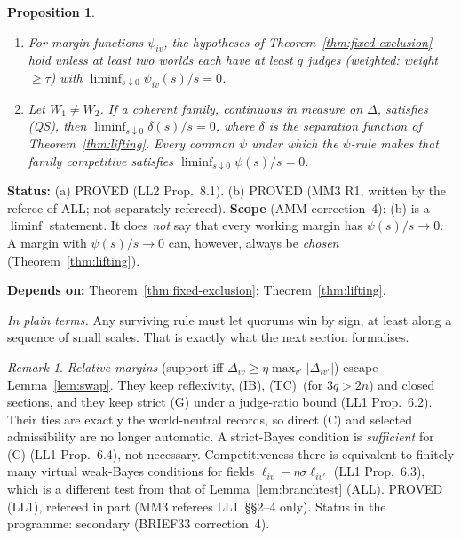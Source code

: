 \documentclass[11pt]{article}
\newtheorem{proposition}[theorem]{Proposition}
\theoremstyle{definition}
\theoremstyle{remark}
\newtheorem{remark}[theorem]{Remark}
\newcommand{\src}[1]{\textsf{#1}}
\newcommand{\status}[1]{\par\smallskip\noindent\textbf{Status:} #1\par}
\newcommand{\deps}[1]{\noindent\textbf{Depends on:} #1\par}
\newcommand{\inwords}[1]{\noindent\textit{In plain terms.} #1\par\smallskip}
\newcommand{\QS}{\textup{(QS)}}
\newcommand{\TC}{\textup{(TC)}}
\begin{document}
\begin{proposition}\label{prop:survivors}
\begin{enumerate}[label=(\alph*)]
\item For margin functions $\psi_{iv}$, the hypotheses of Theorem~\ref{thm:fixed-exclusion} hold unless at least two worlds each have at least $q$ judges (weighted: weight $\ge\tau$) with $\liminf_{s\downarrow0}\psi_{iv}(s)/s=0$.
\item Let $W_1\ne W_2$. If a coherent family, continuous in measure on $\Delta$, satisfies \QS, then $\liminf_{s\downarrow0}\delta(s)/s=0$, where $\delta$ is the separation function of Theorem~\ref{thm:lifting}. Every common $\psi$ under which the $\psi$-rule makes that family competitive satisfies $\liminf_{s\downarrow0}\psi(s)/s=0$.
\end{enumerate}
\end{proposition}
\status{(a) PROVED (\src{LL2} Prop.~8.1). (b) PROVED (\src{MM3} R1, written by the referee of \src{ALL}; not separately refereed). \textbf{Scope} (\src{AMM} correction~4): (b) is a $\liminf$ statement. It does \emph{not} say that every working margin has $\psi(s)/s\to0$. A margin with $\psi(s)/s\to0$ can, however, always be \emph{chosen} (Theorem~\ref{thm:lifting}).}
\deps{Theorem~\ref{thm:fixed-exclusion}; Theorem~\ref{thm:lifting}.}
\inwords{Any surviving rule must let quorums win by sign, at least along a sequence of small scales. That is exactly what the next section formalises.}

\begin{remark}\label{rem:relative}
\emph{Relative margins} (support iff $\Delta_{iv}\ge\eta\max_{v'}|\Delta_{iv'}|$) escape Lemma~\ref{lem:swap}. They keep reflexivity, (IB), \TC\ (for $3q>2n$) and closed sections, and they keep strict (G) under a judge-ratio bound (\src{LL1} Prop.~6.2). Their ties are exactly the world-neutral records, so direct (C) and selected admissibility are no longer automatic. A strict-Bayes condition is \emph{sufficient} for (C) (\src{LL1} Prop.~6.4), not necessary. Competitiveness there is equivalent to finitely many virtual weak-Bayes conditions for fields $\ell_{iv}-\eta\sigma\ell_{iv'}$ (\src{LL1} Prop.~6.3), which is a different test from that of Lemma~\ref{lem:branchtest} (\src{ALL}). PROVED (\src{LL1}), refereed in part (\src{MM3} referees LL1~\S\S2--4 only). Status in the programme: secondary (\src{BRIEF33} correction~4).
\end{remark}

\end{document}
